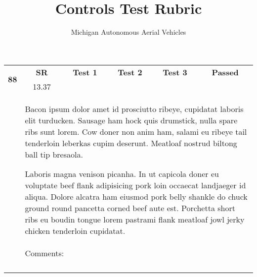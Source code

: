 \documentclass[]{article}
\title{Controls Test Rubric}
\author{Michigan Autonomous Aerial Vehicles}
\newcommand{\testrubric}[3]{
\begin{tabular}{
p{\dimexpr 0.10\linewidth-2\tabcolsep}|
p{\dimexpr 0.18\linewidth-2\tabcolsep}|
p{\dimexpr 0.18\linewidth-2\tabcolsep}|
p{\dimexpr 0.18\linewidth-2\tabcolsep}|
p{\dimexpr 0.18\linewidth-2\tabcolsep}|
p{\dimexpr 0.18\linewidth-2\tabcolsep}|
}
\hline\hline
\multicolumn{1}{|c|}{\multirow{3}{*}{\textbf{#1}}} & 
\multicolumn{1}{|c|}{\textbf{SR}} & 
\multicolumn{1}{|c|}{\textbf{Test 1}} & 
\multicolumn{1}{|c|}{\textbf{Test 2}} & 
\multicolumn{1}{|c|}{\textbf{Test 3}} &
\multicolumn{1}{|c|}{\textbf{Passed}}\\
\cline{2-6}  
\multicolumn{1}{|c|}{} & \multicolumn{1}{|c|}{\multirow{2}{*}{#2}} &  &  &  & \\
\multicolumn{1}{|c|}{} &  &  &  &  & \\
\hline 
     & \multicolumn{5}{|p{\dimexpr 0.90\linewidth-2\tabcolsep}|}{
           #3
     } \\
\cline{2-6}
     & \multicolumn{5}{|p{\dimexpr 0.90\linewidth-2\tabcolsep}|}{
           Comments:
     } \\
     & \multicolumn{5}{|c|}{}\\
     & \multicolumn{5}{|c|}{}\\
     & \multicolumn{5}{|c|}{}\\
     & \multicolumn{5}{|c|}{}\\ \cline{2-6}\cline{2-6}
     
\end{tabular}
}
\begin{document}
\maketitle

\begin{abstract}

\end{abstract}

\large
\testrubric{88}{13.37}{Bacon ipsum dolor amet id prosciutto ribeye, cupidatat laboris elit turducken. Sausage ham hock quis drumstick, nulla spare ribs sunt lorem. Cow doner non anim ham, salami eu ribeye tail tenderloin leberkas cupim deserunt. Meatloaf nostrud biltong ball tip bresaola.

Laboris magna venison picanha. In ut capicola doner eu voluptate beef flank adipisicing pork loin occaecat landjaeger id aliqua. Dolore alcatra ham eiusmod pork belly shankle do chuck ground round pancetta corned beef aute est. Porchetta short ribs eu boudin tongue lorem pastrami flank meatloaf jowl jerky chicken tenderloin cupidatat.}
\end{document}
